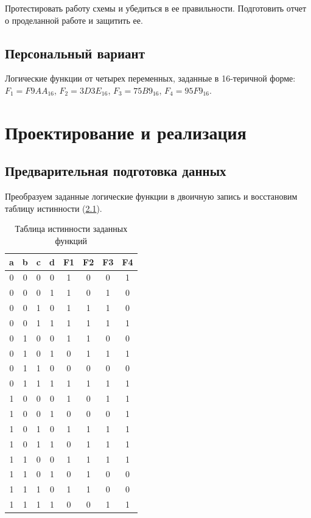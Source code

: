\documentclass[14pt, a4paper]{extreport}
\begin{document}
Протестировать работу схемы и убедиться в ее правильности. Подготовить отчет о проделанной работе и защитить ее.

\section{Персональный вариант}
Логические функции от четырех переменных, заданные в 16-теричной форме: $F_{1} = F9AA_{16}$, $F_{2} = 3D3E_{16}$, $F_{3} = 75B9_{16}$, $F_{4} = 95F9_{16}$.

\chapter{Проектирование и реализация}
\section{Предварительная подготовка данных}
Преобразуем заданные логические функции в двоичную запись и восстановим таблицу истинности (\cref{tab:function-values}).

\begin{table}[!htbp]
	\caption{Таблица истинности заданных функций}
	\label{tab:function-values}
	\begin{tabular}{|c|c|c|c|c|c|c|c|}
		\hline
		a & b & c & d & F1 & F2 & F3 & F4 \\
		\hline
		0 & 0 & 0 & 0 & 1  & 0  & 0  & 1  \\
		\hline
		0 & 0 & 0 & 1 & 1  & 0  & 1  & 0  \\
		\hline
		0 & 0 & 1 & 0 & 1  & 1  & 1  & 0  \\
		\hline
		0 & 0 & 1 & 1 & 1  & 1  & 1  & 1  \\
		\hline
		0 & 1 & 0 & 0 & 1  & 1  & 0  & 0  \\
		\hline
		0 & 1 & 0 & 1 & 0  & 1  & 1  & 1  \\
		\hline
		0 & 1 & 1 & 0 & 0  & 0  & 0  & 0  \\
		\hline
		0 & 1 & 1 & 1 & 1  & 1  & 1  & 1  \\
		\hline
		1 & 0 & 0 & 0 & 1  & 0  & 1  & 1  \\
		\hline
		1 & 0 & 0 & 1 & 0  & 0  & 0  & 1  \\
		\hline
		1 & 0 & 1 & 0 & 1  & 1  & 1  & 1  \\
		\hline
		1 & 0 & 1 & 1 & 0  & 1  & 1  & 1  \\
		\hline
		1 & 1 & 0 & 0 & 1  & 1  & 1  & 1  \\
		\hline
		1 & 1 & 0 & 1 & 0  & 1  & 0  & 0  \\
		\hline
		1 & 1 & 1 & 0 & 1  & 1  & 0  & 0  \\
		\hline
		1 & 1 & 1 & 1 & 0  & 0  & 1  & 1  \\
		\hline
	\end{tabular}
\end{table}
\end{document}
